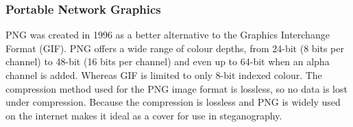 \subsubsection*{Portable Network Graphics}
PNG was created in 1996 as a better alternative to the Graphics Interchange Format (GIF).
PNG offers a wide range of colour depths, from 24-bit (8 bits per channel) to 48-bit (16 bits per channel) and even up to 64-bit when an alpha channel is added.
Whereas GIF is limited to only 8-bit indexed colour.
The compression method used for the PNG image format is lossless, so no data is lost under compression.
Because the compression is lossless and PNG is widely used on the internet makes it ideal as a cover for use in steganography.


